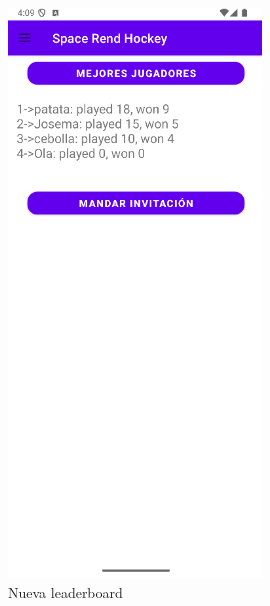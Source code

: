 \documentclass[a4paper,openright,12pt]{article}
\begin{document}
\begin{figure}[htp]
    \begin{minipage}{0.3\textwidth}
        \centering
        \includegraphics[width=0.6\textwidth]{Images/Vista_It4_3.png} 
        \caption{Nueva leaderboard}
        \label{fig:leaderboard}
    \end{minipage}
    \hfill
    \begin{minipage}{0.3\textwidth}
        \centering

\end{minipage}
\end{figure}
\end{document}
